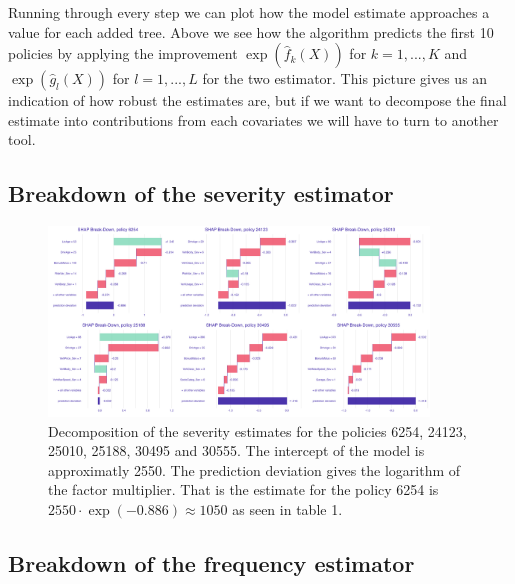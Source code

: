 \documentclass[
]{article}
\begin{document}
Running through every step we can plot how the model estimate approaches
a value for each added tree. Above we see how the algorithm predicts the
first 10 policies by applying the improvement \(\exp(\hat f_k(X))\) for
\(k=1,...,K\) and \(\exp(\hat g_l(X))\) for \(l=1,...,L\) for the two
estimator. This picture gives us an indication of how robust the
estimates are, but if we want to decompose the final estimate into
contributions from each covariates we will have to turn to another tool.

\hypertarget{breakdown-of-the-severity-estimator}{%
\subsection{Breakdown of the severity
estimator}\label{breakdown-of-the-severity-estimator}}

\begin{figure}[h]
    \centering
    \includegraphics[width=0.9\textwidth]{figures/sev_shap_breakdown.png}
    \caption{Decomposition of the severity estimates for the policies 6254, 24123, 25010, 25188, 30495 and 30555. The intercept of the model is approximatly 2550. The prediction deviation gives the logarithm of the factor multiplier. That is the estimate for the policy 6254 is $2550\cdot \exp(-0.886)\approx 1050$ as seen in table 1.}
\end{figure}

\hypertarget{breakdown-of-the-frequency-estimator}{%
\subsection{Breakdown of the frequency
estimator}\label{breakdown-of-the-frequency-estimator}}
\end{document}
